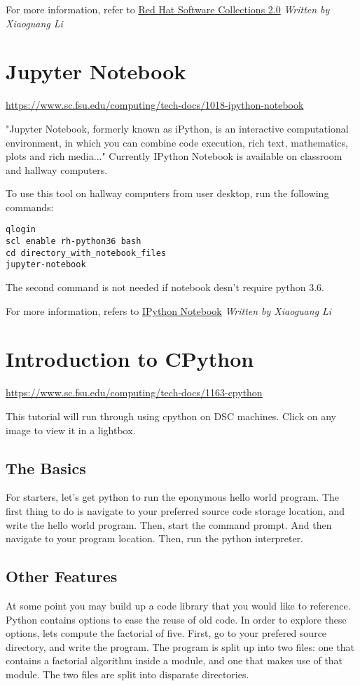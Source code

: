 \documentclass[12pt,a4paper]{article}
\begin{document}
For more information, refer to \href{https://access.redhat.com/documentation/en-us/red_hat_software_collections/2/html/user_guide/index}{Red Hat Software Collections 2.0}
\hfill \textit{Written by Xiaoguang Li}

\section{Jupyter Notebook}
\url{https://www.sc.fsu.edu/computing/tech-docs/1018-ipython-notebook}

"Jupyter Notebook, formerly known as iPython, is an interactive computational environment, in which you can combine code execution, rich text, mathematics, plots and rich media..." Currently IPython Notebook is available on classroom and hallway computers.

To use this tool on hallway computers from user desktop, run the following commands:
\begin{verbatim}
qlogin
scl enable rh-python36 bash
cd directory_with_notebook_files
jupyter-notebook
\end{verbatim}
The second command is not needed if notebook desn't require python 3.6.

For more information, refers to \href{http://jupyter.org/}{IPython Notebook}
\hfill \textit{Written by Xiaoguang Li}

\section{Introduction to CPython}
\url{https://www.sc.fsu.edu/computing/tech-docs/1163-cpython}

This tutorial will run through using cpython on DSC machines.
Click on any image to view it in a lightbox.

\subsection*{The Basics}
For starters, let's get python to run the eponymous hello world program. The first thing to do is navigate to your preferred source code storage location, and write the hello world program.
Then, start the command prompt.
And then navigate to your program location.
Then, run the python interpreter.

\subsection*{Other Features}
At some point you may build up a code library that you would like to reference. Python contains options to ease the reuse of old code. In order to explore these options, lets compute the factorial of five. First, go to your prefered source directory, and write the program. The program is split up into two files: one that contains a factorial algorithm inside a module, and one that makes use of that module. The two files are split into disparate directories.
\end{document}
